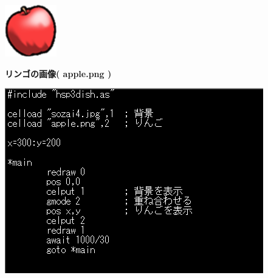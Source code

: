 \documentclass[a4paper,dvipdfmx]{jarticle}
\begin{document}
\begin{center}
\includegraphics[width=2.249cm,height=2.249cm]{text04-img/text04-img016.png}

\end{center}

\bigskip


\bigskip


\bigskip

{\bfseries
リンゴの画像( apple.png )}


\bigskip


\bigskip



\begin{center}
\includegraphics[width=11.245cm,height=8.07cm]{text04-img/text04-img017.png}

\end{center}

\bigskip


\bigskip


\bigskip


\bigskip


\bigskip


\bigskip


\bigskip


\bigskip


\bigskip


\bigskip


\bigskip


\bigskip
\end{document}
